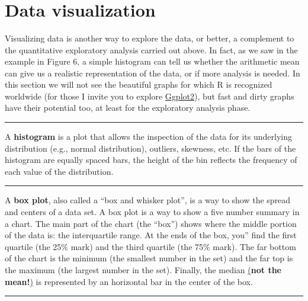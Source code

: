 \documentclass[
]{svmono}
\begin{document}
~

~

~

\hypertarget{data-visualization}{%
\section{Data visualization}\label{data-visualization}}

Visualizing data is another way to explore the data, or better, a
complement to the quantitative exploratory analysis carried out above.
In fact, as we saw in the example in Figure 6, a simple histogram can
tell us whether the arithmetic mean can give us a realistic
representation of the data, or if more analysis is needed. In this
section we will not see the beautiful graphs for which R is recognized
worldwide (for those I invite you to explore \protect\hyperlink{ggplot2}{Ggplot2}), but fast and
dirty graphs have their potential too, at least for the exploratory
analysis phase.

\begin{center}\rule{0.5\linewidth}{0.5pt}\end{center}

A \textbf{histogram} is a plot that allows the inspection of the data for its
underlying distribution (e.g., normal distribution), outliers, skewness,
etc. If the bars of the histogram are equally spaced bars, the height of
the bin reflects the frequency of each value of the distribution.

\begin{center}\rule{0.5\linewidth}{0.5pt}\end{center}

A \textbf{box plot}, also called a ``box and whisker plot'', is a way to show
the spread and centers of a data set. A box plot is a way to show a five
number summary in a chart. The main part of the chart (the ``box'') shows
where the middle portion of the data is: the interquartile range. At the
ends of the box, you'' find the first quartile (the 25\% mark) and the
third quartile (the 75\% mark). The far bottom of the chart is the
minimum (the smallest number in the set) and the far top is the maximum
(the largest number in the set). Finally, the median
\ul{(}\textbf{not the mean!}\ul{)} is represented by an
horizontal bar in the center of the box.

\begin{center}\rule{0.5\linewidth}{0.5pt}\end{center}
\end{document}
